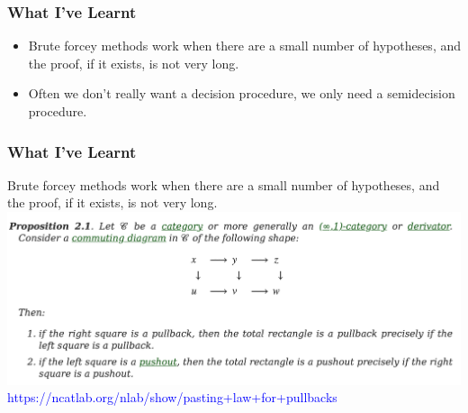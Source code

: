 \documentclass{beamer}
\begin{document}
\begin{frame}
  \frametitle{What I've Learnt}
  \begin{itemize}
    \item Brute forcey methods work when there are a small number of hypotheses,
    and the proof, if it exists, is not very long.
    \item Often we don't really want a decision procedure, we only need
      a semidecision procedure.
  \end{itemize}
\end{frame}

\begin{frame}
  \frametitle{What I've Learnt}
    Brute forcey methods work when there are a small number of hypotheses,
    and the proof, if it exists, is not very long.
  \includegraphics[width=\linewidth]{nlab.png}
  \textcolor{blue}{https://ncatlab.org/nlab/show/pasting+law+for+pullbacks}
\end{frame}



\begin{frame}
\end{frame}
\end{document}
